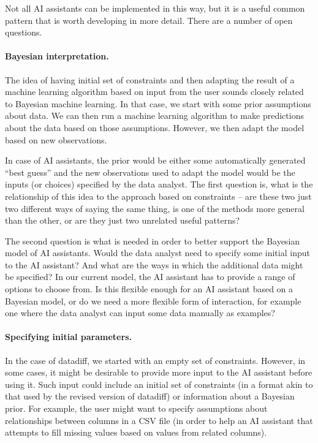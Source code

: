 \documentclass{article}
\begin{document}
Not all AI assistants can be implemented in this way, but it is a useful common pattern that is
worth developing in more detail. There are a number of open questions.

\paragraph{Bayesian interpretation.}
The idea of having initial set of constraints and then adapting the result of a machine learning
algorithm based on input from the user sounds closely related to Bayesian machine learning. In 
that case, we start with some prior assumptions about data. We can then run a machine learning 
algorithm to make predictions about the data based on those assumptions. However, we then adapt
the model based on new observations.


In case of AI assistants, the prior would be either some automatically generated ``best guess''
and the new observations used to adapt the model would be the inputs (or choices) specified by 
the data analyst. The first question is, what is the relationship of this idea to the approach
based on constraints -- are these two just two different ways of saying the same thing, is one
of the methods more general than the other, or are they just two unrelated useful patterns?

The second question is what is needed in order to better support the Bayesian model of AI assistants.
Would the data analyst need to specify some initial input to the AI assistant? And what are the
ways in which the additional data might be specified? In our current model, the AI assistant has
to provide a range of options to choose from. Is this flexible enough for an AI assistant based
on a Bayesian model, or do we need a more flexible form of interaction, for example one where the
data analyst can input some data manually as examples?

\paragraph{Specifying initial parameters.} 
In the case of datadiff, we started with an empty set of constraints. However, in some cases, it
might be desirable to provide more input to the AI assistant before using it. Such input could 
include an initial set of constraints (in a format akin to that used by the revised version of 
datadiff) or information about a Bayesian prior. For example, the user might want to specify 
assumptions about relationships between columns in a CSV file (in order to help an AI assistant
that attempts to fill missing values based on values from related columns).
\end{document}
